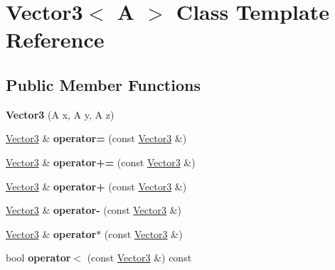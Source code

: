 \hypertarget{classVector3}{}\section{Vector3$<$ A $>$ Class Template Reference}
\label{classVector3}
\subsection*{Public Member Functions}
\begin{DoxyCompactItemize}
\item 
\hypertarget{classVector3_a8172c8eeeac464f7901ccf9b6e877d6a}{}{\bfseries Vector3} (A x, A y, A z)\label{classVector3_a8172c8eeeac464f7901ccf9b6e877d6a}

\item 
\hypertarget{classVector3_a7c032df33d71eb42d7582c2c1a8d7e21}{}\hyperlink{classVector3}{Vector3} \& {\bfseries operator=} (const \hyperlink{classVector3}{Vector3} \&)\label{classVector3_a7c032df33d71eb42d7582c2c1a8d7e21}

\item 
\hypertarget{classVector3_ab2772005b01e88107d0687a648d54593}{}\hyperlink{classVector3}{Vector3} \& {\bfseries operator+=} (const \hyperlink{classVector3}{Vector3} \&)\label{classVector3_ab2772005b01e88107d0687a648d54593}

\item 
\hypertarget{classVector3_a42d9b73277dc71b61c973c23657758b0}{}\hyperlink{classVector3}{Vector3} \& {\bfseries operator+} (const \hyperlink{classVector3}{Vector3} \&)\label{classVector3_a42d9b73277dc71b61c973c23657758b0}

\item 
\hypertarget{classVector3_a1258accb6790dd41327d0f437a0c79b1}{}\hyperlink{classVector3}{Vector3} \& {\bfseries operator-\/} (const \hyperlink{classVector3}{Vector3} \&)\label{classVector3_a1258accb6790dd41327d0f437a0c79b1}

\item 
\hypertarget{classVector3_afa5da12f46f9bd298e4e6116de337b10}{}\hyperlink{classVector3}{Vector3} \& {\bfseries operator$\ast$} (const \hyperlink{classVector3}{Vector3} \&)\label{classVector3_afa5da12f46f9bd298e4e6116de337b10}

\item 
\hypertarget{classVector3_ac8bd3237be39160b4e78319e6f8d2cb9}{}bool {\bfseries operator$<$} (const \hyperlink{classVector3}{Vector3} \&) const \label{classVector3_ac8bd3237be39160b4e78319e6f8d2cb9}


\end{DoxyCompactItemize}
